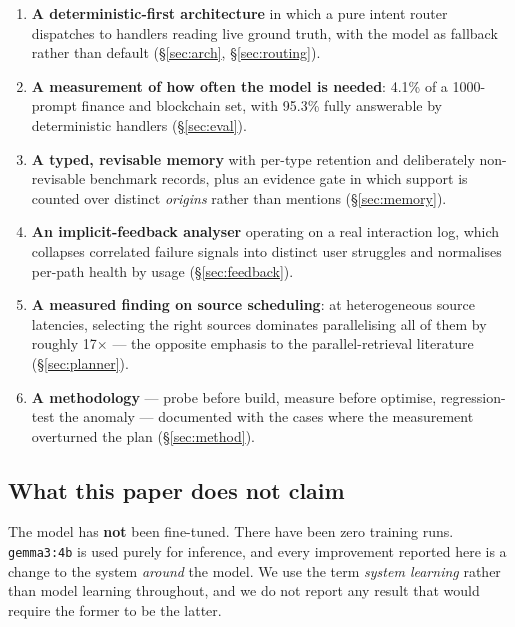 \documentclass[10pt,twocolumn]{article}
\newcommand{\code}[1]{\texttt{\small #1}}
\begin{document}
\begin{enumerate}\itemsep2pt
\item \textbf{A deterministic-first architecture} in which a pure intent router
dispatches to handlers reading live ground truth, with the model as fallback rather than
default (\S\ref{sec:arch}, \S\ref{sec:routing}).

\item \textbf{A measurement of how often the model is needed}: 4.1\% of a
1000-prompt finance and blockchain set, with 95.3\% fully answerable by deterministic
handlers (\S\ref{sec:eval}).

\item \textbf{A typed, revisable memory} with per-type retention and deliberately
non-revisable benchmark records, plus an evidence gate in which support is counted over
distinct \emph{origins} rather than mentions (\S\ref{sec:memory}).

\item \textbf{An implicit-feedback analyser} operating on a real interaction log,
which collapses correlated failure signals into distinct user struggles and normalises
per-path health by usage (\S\ref{sec:feedback}).

\item \textbf{A measured finding on source scheduling}: at heterogeneous source
latencies, selecting the right sources dominates parallelising all of them by roughly
17$\times$ --- the opposite emphasis to the parallel-retrieval literature
(\S\ref{sec:planner}).

\item \textbf{A methodology} --- probe before build, measure before optimise,
regression-test the anomaly --- documented with the cases where the measurement
overturned the plan (\S\ref{sec:method}).
\end{enumerate}

\subsection{What this paper does not claim}

The model has \textbf{not} been fine-tuned. There have been zero training runs.
\code{gemma3:4b} is used purely for inference, and every improvement reported here is a
change to the system \emph{around} the model. We use the term \emph{system learning}
rather than model learning throughout, and we do not report any result that would
require the former to be the latter.

\end{document}
